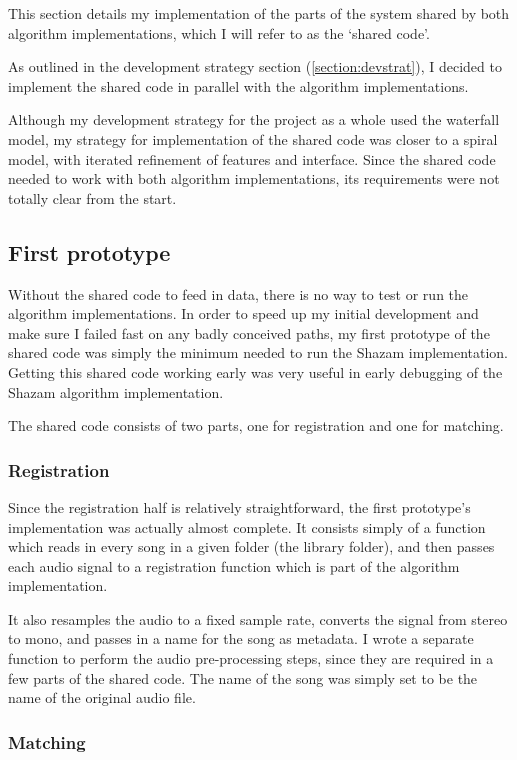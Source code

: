 \documentclass[12pt,a4paper,twoside,openright]{report}
\begin{document}
This section details my implementation of the parts of the system shared by both algorithm implementations, which I will refer to as the `shared code'.

As outlined in the development strategy section (\ref{section:devstrat}), I decided to implement the shared code in parallel with the algorithm implementations.

Although my development strategy for the project as a whole used the waterfall model, my strategy for implementation of the shared code was closer to a spiral model, with iterated refinement of features and interface. Since the shared code needed to work with both algorithm implementations, its requirements were not totally clear from the start. 


\subsection{First prototype}

Without the shared code to feed in data, there is no way to test or run the algorithm implementations. In order to speed up my initial development and make sure I failed fast on any badly conceived paths, my first prototype of the shared code was simply the minimum needed to run the Shazam implementation. Getting this shared code working early was very useful in early debugging of the Shazam algorithm implementation.

The shared code consists of two parts, one for registration and one for matching. 

\subsubsection{Registration}

Since the registration half is relatively straightforward, the first prototype's implementation was actually almost complete. It consists simply of a function which reads in every song in a given folder (the library folder), and then passes each audio signal to a registration function which is part of the algorithm implementation. 

It also resamples the audio to a fixed sample rate, converts the signal from stereo to mono, and passes in a name for the song as metadata. I wrote a separate function to perform the audio pre-processing steps, since they are required in a few parts of the shared code. The name of the song was simply set to be the name of the original audio file.

\subsubsection{Matching}
\end{document}
